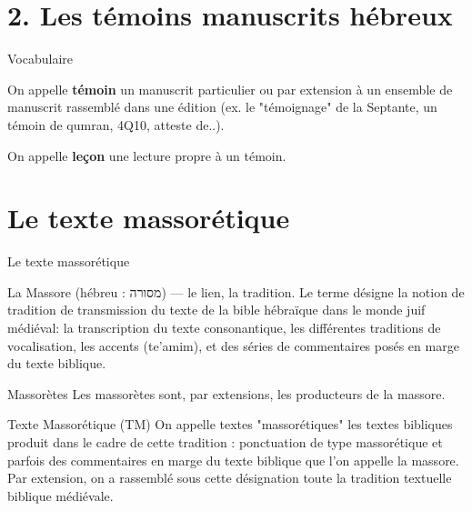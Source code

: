 \documentclass[11pt]{beamer}
\begin{document}
\section{2. Les témoins manuscrits hébreux}

\begin{frame}{Vocabulaire}
\begin{definition}
    On appelle \textbf{témoin} un manuscrit particulier ou par extension à un ensemble de manuscrit rassemblé dans une édition (ex. le "témoignage" de la Septante, un témoin de qumran, 4Q10, atteste de..).
\end{definition}

\begin{definition}
    On appelle \textbf{leçon} une lecture propre à un témoin.
\end{definition}
    
\end{frame}

\section{Le texte massorétique}

\begin{frame}{Le texte massorétique}
\small{
\begin{alertblock}{La Massore (hébreu : \texthebrew{מסורה}) --- le lien, la tradition.}
Le terme désigne la notion de tradition de transmission du texte de la bible hébraïque dans le monde juif médiéval: la transcription du texte consonantique, les différentes traditions de vocalisation, les accents (te'amim), et des séries de commentaires posés en marge du texte biblique.
\end{alertblock}

\begin{alertblock}{Massorètes}
Les massorètes sont, par extensions, les producteurs de la massore.
\end{alertblock}

\begin{alertblock}{Texte Massorétique (TM)}
      On appelle textes "massorétiques" les textes bibliques produit dans le cadre de cette tradition : ponctuation de type massorétique et parfois des commentaires en marge du texte biblique que l'on appelle la massore. Par extension, on a rassemblé sous cette désignation toute la tradition textuelle biblique médiévale.
\end{alertblock}
}
\end{frame}
\end{document}
